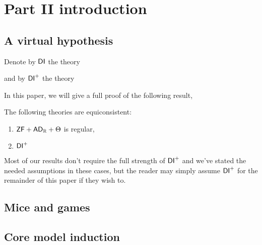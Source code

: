 \documentclass[../../main]{subfiles}
\begin{document}
\chapter{Part II introduction}
\thispagestyle{fancy}


\section{A virtual hypothesis}


\qquad Denote by  $\operatorname{\textsf{DI}}$ the theory

and by  $\operatorname{\textsf{DI}}^+$ the theory

In this paper, we will give a full proof of the following result,

\begin{theorem}
  The following theories are equiconsistent:
  \begin{enumerate}
    \item $\textsf{ZF} + \textsf{AD}_{\mathbb{R}} + \Theta$ is regular,
    \item $\operatorname{\textsf{DI}}^+$
  \end{enumerate}
\end{theorem}

Most of our results don't require the full strength of $\operatorname{\textsf{DI}}^+$ and we've stated the needed assumptions in these cases, but the reader may simply assume $\operatorname{\textsf{DI}}^+$ for the remainder of this paper if they wish to.


\section{Mice and games}



\section{Core model induction}
\end{document}
